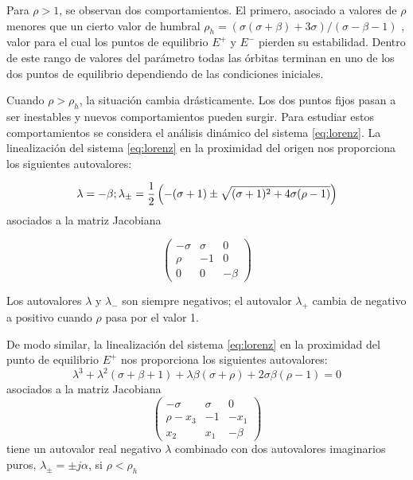 Para $\rho>1$, se observan dos comportamientos.
El primero, asociado a valores de $\rho$ menores que un cierto valor de humbral $\rho_h=(\sigma(\sigma+\beta)+3\sigma)/(\sigma-\beta-1)$ , valor para el cual los puntos de equilibrio $E^+$ y $E^-$ pierden su estabilidad.
Dentro de este rango de valores del parámetro todas las órbitas terminan en uno de los dos puntos de equilibrio dependiendo de las condiciones iniciales.

Cuando $\rho>\rho_h$, la situación cambia drásticamente.
Los dos puntos fijos    pasan a ser inestables y nuevos comportamientos pueden surgir.
Para estudiar estos comportamientos se considera el análisis dinámico del sistema \ref{eq:lorenz}. 
La linealización del sistema \ref{eq:lorenz} en la proximidad del origen nos proporciona los siguientes autovalores:

\begin{equation}
\lambda = -\beta;\\
\lambda_\pm = \frac{1}{2} \left(-(\sigma+1) \pm \sqrt{(\sigma+1)^2+4\sigma(\rho-1)} \right) \nonumber
\end{equation}
 asociados a la matriz Jacobiana
 
\begin{equation}
\begin{pmatrix}
-\sigma &\sigma &0 \\
\rho &-1 &0 \\
0 &0 &-\beta
\end{pmatrix}
\nonumber
\end{equation}

Los autovalores  $\lambda$ y $\lambda_-$ son siempre negativos; el autovalor $\lambda_+$ cambia de negativo a positivo cuando $\rho$ pasa por el valor 1.

De modo similar, la linealización del sistema \ref{eq:lorenz} en la proximidad del punto de equilibrio $E^+$ nos proporciona los siguientes autovalores:
\begin{equation}
\lambda^3+\lambda^2(\sigma+\beta+1)+\lambda\beta(\sigma+\rho)+2\sigma\beta(\rho-1)=0 \nonumber
\end{equation}
asociados a la matriz Jacobiana
\begin{equation}
\begin{pmatrix}
-\sigma &\sigma &0 \\
\rho-x_3 &-1 &-x_1 \\
x_2 &x_1 &-\beta
\end{pmatrix}
\nonumber
\end{equation}
tiene un autovalor real negativo $\lambda$ combinado con dos autovalores imaginarios puros, $\lambda_\pm = \pm j \alpha$, si $\rho < \rho_h$

